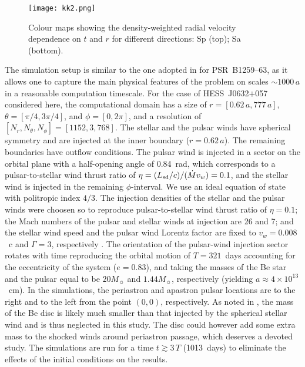 \documentclass[usenatbib]{mn2e}
\def\psr{{PSR~B1259--63}}
\def\j06{{HESS~J0632$+$057}}
\begin{document}
\begin{figure}
\texttt{[image: kk2.png]}
\vspace{-0.65cm}
\caption{Colour maps showing the density-weighted radial velocity dependence on $t$ and $r$ for different directions: Sp (top); Sa (bottom).}
\label{fig:vav_r_t}
\end{figure}

The simulation setup is similar to the one adopted in \cite{bb16} for \psr{}, as it allows one to capture the main physical features of the problem on scales $\sim 1000\,a$ in a reasonable computation timescale. For the case of \j06{} considered here, the computational domain has a size of 
$r=[0.62\,a,777\,a]$, $\theta = [\pi/4,3\pi/4]$, and $\phi = [0,2\pi]$, and a resolution of $[N_{r},N_{\theta},N_{\phi}]=[1152,3,768]$. The stellar and the pulsar winds have 
spherical symmetry and are injected at the inner boundary ($r=0.62\,a$). The remaining boundaries have outflow conditions. The pulsar wind is injected in a sector on the orbital 
plane with a half-opening angle of 0.84~rad, which corresponds to a pulsar-to-stellar wind thrust ratio of $\eta=(L_{\rm sd}/c)/(\dot{M}v_{w}) = 0.1$, and the  stellar wind is injected in the remaining 
$\phi$-interval. We use an ideal equation of state with politropic index $4/3$. The injection densities of the stellar and the pulsar winds were choosen so to reproduce pulsar-to-stellar wind thrust ratio of 
$\eta =0.1$; the Mach numbers of the pulsar and stellar winds at injection are {26 and 7}; and the stellar wind speed and the pulsar wind Lorentz factor are fixed to $v_{w}=0.008$~c and 
$\Gamma = 3$, respectively \citep[see, e.g.,][regarding the validity of moderate Lorentz factors]{bbkp12,bbp15}. The orientation of the pulsar-wind injection sector rotates with time reproducing the orbital motion of $T=321$~days accounting for the eccentricity of the system ($e= 0.83$), and taking the masses 
of the Be star and the pulsar equal to be $20 M_{\sun}$ and $1.44 M_{\sun}$, respectively (yielding $a\approx 4\times10^{13}$~cm). In the simulations, the periastron and 
apastron pulsar locations are to the right and to the left from the point $(0,0)$, respectively. As noted in \cite{bb16}, the mass of the Be disc is likely much smaller 
than that injected by the spherical stellar wind and is thus neglected in this study. The disc could however add some extra mass to the shocked winds around periastron passage, which deserves a devoted study. The simulations are run for a time $t\gtrsim 3\,T$ (1013~days) to eliminate 
the effects of the initial conditions on the results. 
\end{document}
